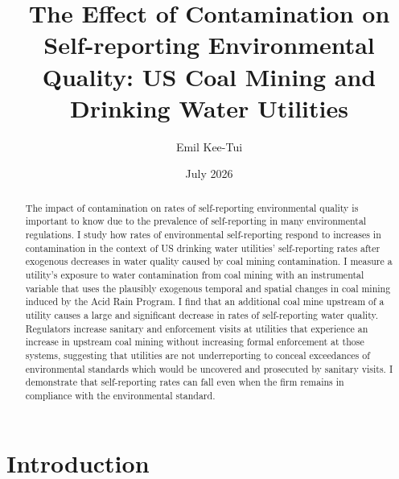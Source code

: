 \documentclass{article}
\begin{document}
\title{The Effect of Contamination on Self-reporting Environmental Quality: US Coal Mining and Drinking Water Utilities}
\author{Emil Kee-Tui}
    
\date{July 2026}
\maketitle
\thispagestyle{empty}
\singlespacing

\begin{center}\begin{abstract}
		\noindent The impact of contamination on rates of self-reporting environmental quality is important to know due to the prevalence of self-reporting in many environmental regulations. I study how rates of environmental self-reporting respond to increases in contamination in the context of US drinking water utilities' self-reporting rates after exogenous decreases in water quality caused by coal mining contamination. I measure a utility's exposure to water contamination from coal mining with an instrumental variable that uses the plausibly exogenous temporal and spatial changes in coal mining induced by the Acid Rain Program. I find that an additional coal mine upstream of a utility causes a large and significant decrease in rates of self-reporting water quality. Regulators increase sanitary and enforcement visits at utilities that experience an increase in upstream coal mining without increasing formal enforcement at those systems, suggesting that utilities are not underreporting to conceal exceedances of environmental standards which would be uncovered and prosecuted by sanitary visits. I demonstrate that self-reporting rates can fall even when the firm remains in compliance with the environmental standard.
\end{abstract}\end{center}
	
\newpage
\singlespacing


\section{Introduction}
\end{document}
